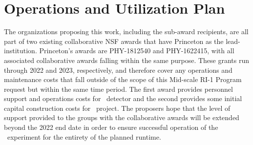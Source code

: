 \section{Operations and Utilization Plan}


The organizations proposing this work, including the sub-award recipients, are all part of two existing collaborative NSF awards that have Princeton as the lead-institution.  Princeton's awards are PHY-1812540 and PHY-1622415, with all associated collaborative awards falling within the same purpose.  These grants run through 2022 and 2023, respectively, and therefore cover any operations and maintenance costs that fall outside of the scope of this Mid-scale RI-1 Program request but within the same time period.  The first award provides personnel support and operations costs for \DSk\ detector and the second provides some initial capital construction costs for \DSk\ project.  The proposers hope that the level of support provided to the groups with the collaborative awards will be extended beyond the 2022 end date in order to ensure successful operation of the \DSk\ experiment for the entirety of the planned runtime.